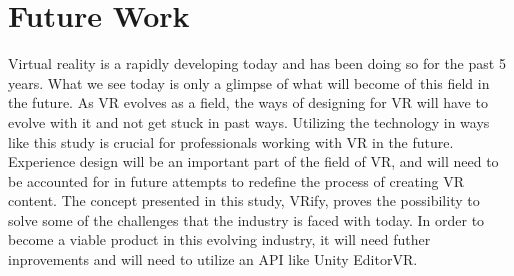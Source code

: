\chapter{Future Work}
Virtual reality is a rapidly developing today and has been doing so for the past 5 years. What we see today is only a glimpse of what will become of this field in the future. As VR evolves as a field, the ways of designing for VR will have to evolve with it and not get stuck in past ways. Utilizing the technology in ways like this study is crucial for professionals working with VR in the future. Experience design will be an important part of the field of VR, and will need to be accounted for in future attempts to redefine the process of creating VR content. The concept presented in this study, VRify, proves the possibility to solve some of the challenges that the industry is faced with today. In order to become a viable product in this evolving industry, it will need futher inprovements and will need to utilize an API like Unity EditorVR.  
